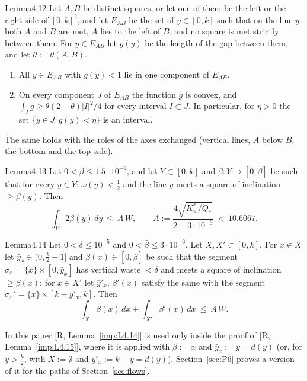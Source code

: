 \documentclass[11pt]{amsart}
\theoremstyle{definition}
\theoremstyle{remark}
\numberwithin{equation}{section}
\begin{document}
\begin{ImpStatement}{Lemma}{4.12}\label{imp:L4.12}
Let $A,B$ be distinct squares, or let one of them be the left or the right side of $[0,k]^2$, and let $E_{AB}$ be the set
of $y\in[0,k]$ such that on the line $y$ both $A$ and $B$ are met, $A$ lies to the left of $B$, and no square is met
strictly between them. For $y\in E_{AB}$ let $g(y)$ be the length of the gap between them, and let $\theta:=\theta(A,B)$.
\begin{enumerate}[label=(\alph*)]
\item All $y\in E_{AB}$ with $g(y)<1$ lie in one component of $E_{AB}$.
\item On every component $J$ of $E_{AB}$ the function $g$ is convex, and $\int_Ig\ge\theta(2-\theta)|I|^2/4$ for every interval
$I\subset J$. In particular, for $\eta>0$ the set $\{y\in J:g(y)<\eta\}$ is an interval.
\end{enumerate}
The same holds with the roles of the axes exchanged (vertical lines, $A$ below $B$, the bottom and the top side).
\end{ImpStatement}

\begin{ImpStatement}{Lemma}{4.13}\label{imp:L4.13}
Let $0<\bar\beta\le1.5\cdot10^{-6}$, and let $Y\subset[0,k]$ and $\beta:Y\to[0,\bar\beta]$ be such that for every $y\in Y$:
$\omega(y)<\frac12$ and the line $y$ meets a square of inclination $\ge\beta(y)$. Then
\[
\int_Y2\beta(y)\,dy\ \le\ A\,W,\qquad A:=\frac{4\sqrt{K_w^*/Q_*}}{2-3\cdot10^{-6}}\ <\ 10.6067 .
\]
\end{ImpStatement}

\begin{ImpStatement}{Lemma}{4.14}\label{imp:L4.14}
Let $0<\delta\le10^{-5}$ and $0<\bar\beta\le3\cdot10^{-6}$. Let $X,X'\subset[0,k]$. For $x\in X$ let $\bar y_x\in(0,\frac k2-1]$ and
$\beta(x)\in[0,\bar\beta]$ be such that the segment $\sigma_x=\{x\}\times[0,\bar y_x]$ has vertical waste $<\delta$ and meets a square of
inclination $\ge\beta(x)$; for $x\in X'$ let $\bar y'_x$, $\beta'(x)$ satisfy the same with the segment
$\sigma_x'=\{x\}\times[k-\bar y'_x,k]$. Then
\[
\int_X\beta(x)\,dx+\int_{X'}\beta'(x)\,dx\ \le\ A\,W .
\]
\end{ImpStatement}

In this paper [R, Lemma~\ref{imp:L4.14}] is used only inside the proof of [R, Lemma~\ref{imp:L4.15}], where it is
applied with $\bar\beta:=\alpha$ and $\bar y_x:=y=d(y)$ (or, for $y>\frac k2$, with $X:=\emptyset$ and
$\bar y'_x:=k-y=d(y)$). Section~\ref{sec:P6} proves a version of it for the paths of Section~\ref{sec:flows}.
\end{document}

